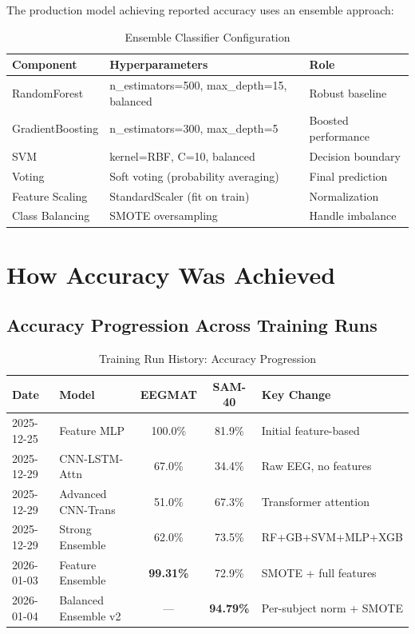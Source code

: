 \documentclass[11pt,a4paper]{article}
\begin{document}
The production model achieving reported accuracy uses an ensemble approach:

\begin{table}[H]
\centering
\caption{Ensemble Classifier Configuration}
\small
\begin{tabular}{lll}
\toprule
\textbf{Component} & \textbf{Hyperparameters} & \textbf{Role} \\
\midrule
RandomForest & n\_estimators=500, max\_depth=15, balanced & Robust baseline \\
GradientBoosting & n\_estimators=300, max\_depth=5 & Boosted performance \\
SVM & kernel=RBF, C=10, balanced & Decision boundary \\
\midrule
Voting & Soft voting (probability averaging) & Final prediction \\
Feature Scaling & StandardScaler (fit on train) & Normalization \\
Class Balancing & SMOTE oversampling & Handle imbalance \\
\bottomrule
\end{tabular}
\end{table}

\section{How Accuracy Was Achieved}

\subsection{Accuracy Progression Across Training Runs}

\begin{table}[H]
\centering
\caption{Training Run History: Accuracy Progression}
\small
\begin{tabular}{llccl}
\toprule
\textbf{Date} & \textbf{Model} & \textbf{EEGMAT} & \textbf{SAM-40} & \textbf{Key Change} \\
\midrule
2025-12-25 & Feature MLP & 100.0\% & 81.9\% & Initial feature-based \\
2025-12-29 & CNN-LSTM-Attn & 67.0\% & 34.4\% & Raw EEG, no features \\
2025-12-29 & Advanced CNN-Trans & 51.0\% & 67.3\% & Transformer attention \\
2025-12-29 & Strong Ensemble & 62.0\% & 73.5\% & RF+GB+SVM+MLP+XGB \\
2026-01-03 & Feature Ensemble & \textbf{99.31\%} & 72.9\% & SMOTE + full features \\
2026-01-04 & Balanced Ensemble v2 & --- & \textbf{94.79\%} & Per-subject norm + SMOTE \\
\bottomrule
\end{tabular}
\end{table}
\end{document}
